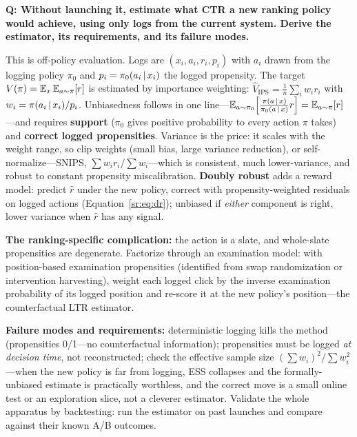 \begin{interviewq}
\textbf{Q: Without launching it, estimate what CTR a new ranking policy would achieve, using only logs from the current system. Derive the estimator, its requirements, and its failure modes.}

 \quad {} \quad \badgefreq{\freqmed}

\stronganswer

This is off-policy evaluation. Logs are $(x_i, a_i, r_i, p_i)$ with $a_i$ drawn from the logging policy $\pi_0$ and $p_i = \pi_0(a_i \,|\, x_i)$ the logged propensity. The target $V(\pi) = \operatorname{\mathbb{E}}_{x}\operatorname{\mathbb{E}}_{a \sim \pi}[r]$ is estimated by importance weighting: $\hat{V}_{\mathrm{IPS}} = \frac{1}{n}\sum_i w_i r_i$ with $w_i = \pi(a_i \,|\, x_i)/p_i$. Unbiasedness follows in one line---$\operatorname{\mathbb{E}}_{a \sim \pi_0}\!\left[\frac{\pi(a \,|\, x)}{\pi_0(a \,|\, x)} r\right] = \operatorname{\mathbb{E}}_{a \sim \pi}[r]$---and requires \textbf{support} ($\pi_0$ gives positive probability to every action $\pi$ takes) and \textbf{correct logged propensities}. Variance is the price: it scales with the weight range, so clip weights (small bias, large variance reduction), or self-normalize---SNIPS, $\sum w_i r_i / \sum w_i$---which is consistent, much lower-variance, and robust to constant propensity miscalibration. \textbf{Doubly robust} adds a reward model: predict $\hat{r}$ under the new policy, correct with propensity-weighted residuals on logged actions (Equation~\ref{sr:eq:dr}); unbiased if \textit{either} component is right, lower variance when $\hat{r}$ has any signal.

\textbf{The ranking-specific complication:} the action is a slate, and whole-slate propensities are degenerate. Factorize through an examination model: with position-based examination propensities (identified from swap randomization or intervention harvesting), weight each logged click by the inverse examination probability of its logged position and re-score it at the new policy's position---the counterfactual LTR estimator.

\textbf{Failure modes and requirements:} deterministic logging kills the method (propensities 0/1---no counterfactual information); propensities must be logged \textit{at decision time}, not reconstructed; check the effective sample size $(\sum w_i)^2/\sum w_i^2$---when the new policy is far from logging, ESS collapses and the formally-unbiased estimate is practically worthless, and the correct move is a small online test or an exploration slice, not a cleverer estimator. Validate the whole apparatus by backtesting: run the estimator on past launches and compare against their known A/B outcomes.


\end{interviewq}
